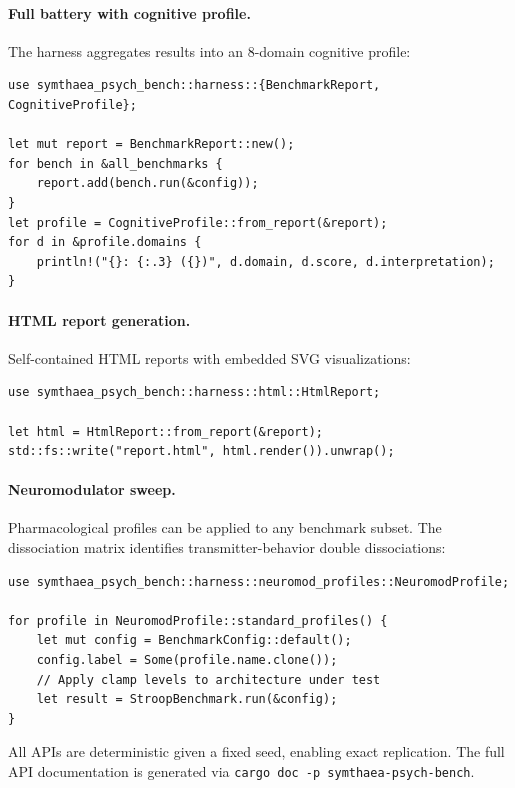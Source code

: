\documentclass[11pt,letterpaper]{article}
\begin{document}
\paragraph{Full battery with cognitive profile.} The harness aggregates results into an 8-domain cognitive profile:

\begin{lstlisting}
use symthaea_psych_bench::harness::{BenchmarkReport, CognitiveProfile};

let mut report = BenchmarkReport::new();
for bench in &all_benchmarks {
    report.add(bench.run(&config));
}
let profile = CognitiveProfile::from_report(&report);
for d in &profile.domains {
    println!("{}: {:.3} ({})", d.domain, d.score, d.interpretation);
}
\end{lstlisting}

\paragraph{HTML report generation.} Self-contained HTML reports with embedded SVG visualizations:

\begin{lstlisting}
use symthaea_psych_bench::harness::html::HtmlReport;

let html = HtmlReport::from_report(&report);
std::fs::write("report.html", html.render()).unwrap();
\end{lstlisting}

\paragraph{Neuromodulator sweep.} Pharmacological profiles can be applied to any benchmark subset. The dissociation matrix identifies transmitter-behavior double dissociations:

\begin{lstlisting}
use symthaea_psych_bench::harness::neuromod_profiles::NeuromodProfile;

for profile in NeuromodProfile::standard_profiles() {
    let mut config = BenchmarkConfig::default();
    config.label = Some(profile.name.clone());
    // Apply clamp levels to architecture under test
    let result = StroopBenchmark.run(&config);
}
\end{lstlisting}

All APIs are deterministic given a fixed seed, enabling exact replication. The full API documentation is generated via \texttt{cargo doc -p symthaea-psych-bench}.
\end{document}
